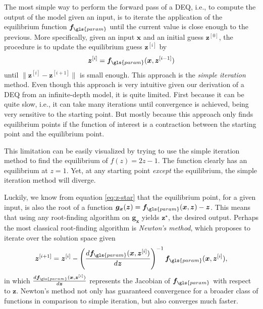 The most simple way to perform the forward pass of a \gls{DEQ}, i.e., to compute the output of the model given an input, is to iterate the application of the equilibrium function $\bm{f}_{\gls{param}}$ until the current value is close enough to the previous.
More specifically, given an input $\bm{x}$ and an initial guess $\bm{z}^{[0]}$, the procedure is to update the equilibrium guess $\bm{z}^{[i]}$ by \[
    \bm{z}^{[i]} = \bm{f}_{\gls{param}}(\bm{x}, \bm{z}^{[i-1]})
\] until $\|\bm{z}^{[i]}-\bm{z}^{[i+1]}\|$ is small enough.
This approach is the \emph{simple iteration} method\cite{suli_introduction_2003}.
Even though this approach is very intuitive given our derivation of a \gls{DEQ} from an infinite-depth model, it is quite limited.
First because it can be quite slow, i.e., it can take many iterations until convergence is achieved, being very sensitive to the starting point.
But mostly because this approach only finds equilibrium points if the function of interest is a contraction between the starting point and the equilibrium point\cite{suli_introduction_2003}.

This limitation can be easily visualized by trying to use the simple iteration method to find the equilibrium of $f(z) = 2z-1$.
The function clearly has an equilibrium at $z=1$.
Yet, at any starting point \emph{except} the equilibrium, the simple iteration method will diverge.

Luckily, we know from equation \eqref{eq:z-star} that the equilibrium point, for a given input, is also the root of a function $\bm{g}_{\bm{x}}(\bm{z}) = \bm{f}_{\gls{param}}(\bm{x},\bm{z}) - \bm{z}$.
This means that using any root-finding algorithm on $\bm{g}_{\bm{x}}$ yields $\bm{z}^{\star}$, the desired output.
Perhaps the most classical root-finding algorithm is \emph{Newton's method}, which proposes to iterate over the solution space given \[
    \bm{z}^{[i+1]} = \bm{z}^{[i]} - \left( \frac{d \bm{f}_{\gls{param}}(\bm{x},\bm{z}^{[i]})}{d\bm{z}} \right)^{-1} \bm{f}_{\gls{param}}(\bm{x},\bm{z}^{[i]})
,\] 
in which $\frac{d \bm{f}_{\gls{param}}(\bm{x},\bm{z}^{[i]})}{d\bm{z}}$ represents the Jacobian of  $\bm{f}_{\gls{param}}$ with respect to $\bm{z}$\footnotemark.
Newton's method not only has guaranteed convergence for a broader class of functions in comparison to simple iteration, but also converges much faster\cite{suli_introduction_2003}.


